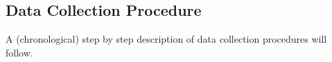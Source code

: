 \begin{comment}    
\subsection{Participants and Recruitment}
\textbf{Target population and study sample}

\textbf{Sample Size} 
 We were able to conduct 22 interviews, which we considered suitable, as this is an exploratory study of a certain implementation of a digital nudge interface, which aims to investigate users perception and experience. 

\textbf{Sampling technique /Recruitment}
    
    The study is limited to investigating how individuals with ability and motivation for physical activity (apparently), experience and perceive the digital nudges for physical activity. Hence, the sampling was non-randomized.
    
     The recruitment was done by standing at various SATS training centers in Oslo and actively recruiting people for the digital nudge trial / intervention. Information sheets was distributed, and consents where collected. In addition it was made sure that everyone signing up to participate had enabled push notifications through their app. In total, 105 participants registered to be a part of the study. Even though everyone agreed to take part in the following interview, we knew from experience from other research, that the actual participation rate is not very high. For that reason, we wanted to recruit as many participants as possible over a time period. 
        
    As the study followed an exploratory approach, it was also nice to have a good selection of participants, if it should be necessary to group/sort/filter them more.
    
\end{comment} 
 
\subsection{Data Collection Procedure}
A (chronological) step by step description of data collection procedures will follow. 
